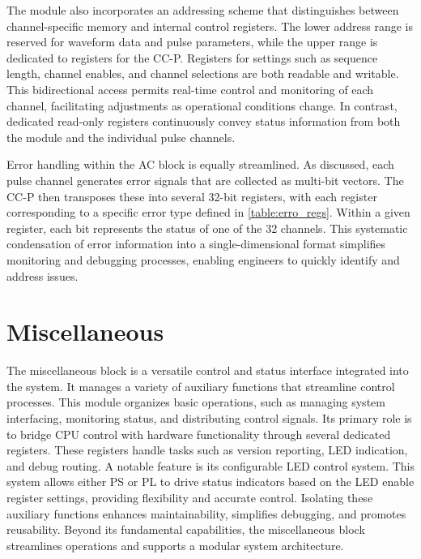 The module also incorporates an addressing scheme that distinguishes between channel-specific memory and internal control registers. The lower address range is reserved for waveform data and pulse parameters, while the upper range is dedicated to registers for the CC-P. Registers for settings such as sequence length, channel enables, and channel selections are both readable and writable. This bidirectional access permits real-time control and monitoring of each channel, facilitating adjustments as operational conditions change. In contrast, dedicated read-only registers continuously convey status information from both the module and the individual pulse channels.

Error handling within the AC block is equally streamlined. As discussed, each pulse channel generates error signals that are collected as multi-bit vectors. The CC-P then transposes these into several 32-bit registers, with each register corresponding to a specific error type defined in \autoref{table:erro_regs}. Within a given register, each bit represents the status of one of the 32 channels. This systematic condensation of error information into a single-dimensional format simplifies monitoring and debugging processes, enabling engineers to quickly identify and address issues.

\section{Miscellaneous}

The miscellaneous block is a versatile control and status interface integrated into the system. It manages a variety of auxiliary functions that streamline control processes. This module organizes basic operations, such as managing system interfacing, monitoring status, and distributing control signals. Its primary role is to bridge CPU control with hardware functionality through several dedicated registers. These registers handle tasks such as version reporting, LED indication, and debug routing. A notable feature is its configurable LED control system. This system allows either PS or PL to drive status indicators based on the LED enable register settings, providing flexibility and accurate control. Isolating these auxiliary functions enhances maintainability, simplifies debugging, and promotes reusability. Beyond its fundamental capabilities, the miscellaneous block streamlines operations and supports a modular system architecture.

